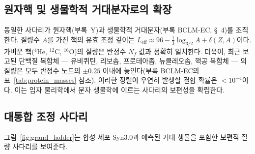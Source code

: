 \documentclass[11pt,a4paper]{article}
\begin{document}
	\subsection{원자핵 및 생물학적 거대분자로의 확장}
	
	동일한 사다리가 원자핵(부록~Y)과 생물학적 거대분자(부록 BCLM-EC, §~4)를 조직한다. 질량수 \(A\)를 가진 핵의 유효 조정 깊이는 \(L_{\mathrm{eff}} \approx 96 - \frac13 \log_{3/2} A + \delta(Z,A)\)이다. 가벼운 핵(\(^4\)He, \(^{12}\)C, \(^{16}\)O)의 질량은 반정수 \(N_f\) 값과 정확히 일치한다. 더욱이, 최근 보고된 단백질 복합체 — 유비퀴틴, 리보솜, 프로테아좀, 뉴클레오솜, 핵공 복합체 — 의 질량은 모두 반정수 노드의 \(\pm 0.25\) 이내에 놓인다(부록 BCLM-EC의 표~\ref{tab:protein_masses} 참조). 이러한 정렬이 우연히 발생할 결합 확률은 \(< 10^{-4}\)이다. 이는 입자 물리학에서 분자 생물학에 이르는 사다리의 보편성을 확립한다.
	
	\subsection{대통합 조정 사다리}
	
	그림~\ref{fig:grand_ladder}는 합성 세포 Syn3.0과 예측된 거대 생물을 포함한 보편적 질량 사다리를 보여준다.
	
\end{document}
